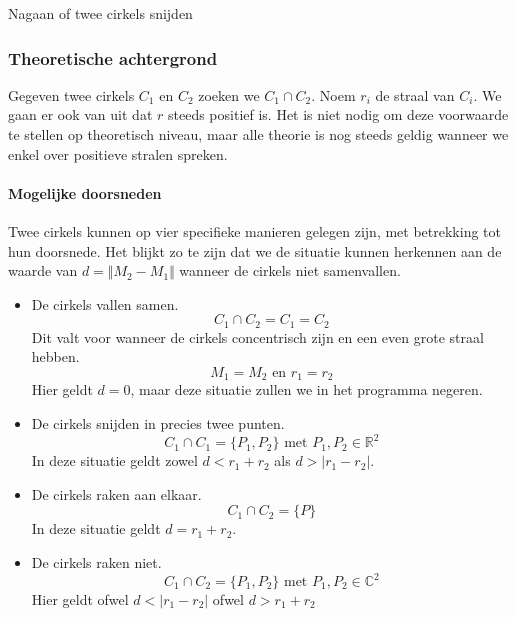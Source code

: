 \begin{algorithm}[H]
  \SetAlgoLined

  \caption{Nagaan of twee cirkels snijden}
\end{algorithm}

\subsubsection{Theoretische achtergrond}
\begin{figure}[H]

\end{figure}
Gegeven twee cirkels $C_1$ en $C_2$ zoeken we $C_1 \cap C_2$. Noem $r_i$ de straal van $C_i$. We gaan er ook van uit dat $r$ steeds positief is. Het is niet nodig om deze voorwaarde te stellen op theoretisch niveau, maar alle theorie is nog steeds geldig wanneer we enkel over positieve stralen spreken.
\paragraph{Mogelijke doorsneden}
Twee cirkels kunnen op vier specifieke manieren gelegen zijn, met betrekking tot hun doorsnede. Het blijkt zo te zijn dat we de situatie kunnen herkennen aan de waarde van $d=\Vert M_2-M_1\Vert$ wanneer de cirkels niet samenvallen.
\begin{itemize}
\item De cirkels vallen samen.\\
\[C_1 \cap C_2 = C_1 = C_2\]
Dit valt voor wanneer de cirkels concentrisch zijn en een even grote straal hebben.
\[
M_1 = M_2 \text{ en } r_1 = r_2
\]
Hier geldt $d = 0$, maar deze situatie zullen we in het programma negeren.

\item De cirkels snijden in precies twee punten.\\
\[C_1 \cap C_1 = \{P_1,P_2\} \text{ met } P_1,P_2 \in \mathbb{R}^2\]
In deze situatie geldt zowel $d < r_1+r_2$ als $ d > |r_1-r_2|$.

\item De cirkels raken aan elkaar.\\
\[C_1 \cap C_2 = \{P\}\]
In deze situatie geldt $d = r_1+r_2$.

\item De cirkels raken niet.
\[C_1 \cap C_2 = \{P_1,P_2\} \text{ met } P_1,P_2 \in \mathbb{C}^2\]
Hier geldt ofwel $d < |r_1-r_2|$ ofwel $d > r_1+r_2$
\end{itemize}

